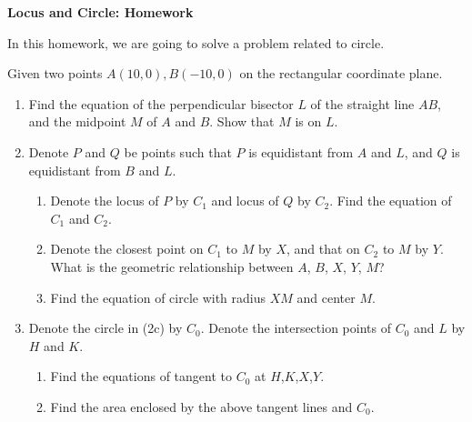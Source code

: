 \documentclass[12pt]{article}
\begin{document}
    \begin{center}
        \textbf{Locus and Circle: Homework}
    \end{center}

    In this homework, we are going to solve a problem related to circle.
    
    Given two points $A(10,0), B(-10,0)$ on the rectangular coordinate plane.

    \begin{enumerate}
        \item Find the equation of the perpendicular bisector $L$ of the straight line $AB$, and the midpoint $M$ of $A$ and $B$. Show that $M$ is on $L$.
        \item Denote $P$ and $Q$ be points such that $P$ is equidistant from $A$ and $L$, and $Q$ is equidistant from $B$ and $L$. \begin{enumerate}
            \item Denote the locus of $P$ by $C_1$ and locus of $Q$ by $C_2$. Find the equation of $C_1$ and $C_2$.
            \item Denote the closest point on $C_1$ to $M$ by $X$, and that on $C_2$ to $M$ by $Y$. What is the geometric relationship between $A$, $B$, $X$, $Y$, $M$?
            \item Find the equation of circle with radius $XM$ and center $M$.
        \end{enumerate}
        \item Denote the circle in (2c) by $C_0$. Denote the intersection points of $C_0$ and $L$ by $H$ and $K$. \begin{enumerate}
            \item Find the equations of tangent to $C_0$ at $H$,$K$,$X$,$Y$.
            \item Find the area enclosed by the above tangent lines and $C_0$.
        \end{enumerate}
    \end{enumerate}
\end{document}
